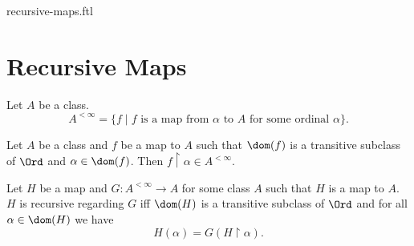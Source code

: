 \documentclass{naproche-library}
\begin{document}
\begin{smodule}{recursive-maps.ftl}

  \section*{Recursive Maps}

  \begin{definition}[forthel,id=SET_THEORY_04_1955917673267200,printid]
    Let $A$ be a class.
    \[ A^{< \infty} = \{f \mid \text{$f$ is a map from $\alpha$ to $A$ for some ordinal $\alpha$} \}. \]
  \end{definition}

  \begin{proposition}[forthel,id=SET_THEORY_04_7841726894964736,printid]
    Let $A$ be a class and $f$ be a map to $A$ such that $\dom(f)$ is a transitive subclass of $\Ord$ and $\alpha \in \dom(f)$.
    Then $f \restriction \alpha \in A^{< \infty}$.
  \end{proposition}

  \begin{forthel}
  \end{forthel}

  \begin{definition}[forthel,id=SET_THEORY_04_5597213870784512,printid]
    Let $H$ be a map and $G : A^{< \infty} \to A$ for some class $A$ such that $H$ is a map to $A$.
    $H$ is recursive regarding $G$ iff $\dom(H)$ is a transitive subclass of $\Ord$ and for all $\alpha \in \dom(H)$ we have \[ H(\alpha) = G(H \restriction \alpha). \]
  \end{definition}

  \begin{forthel}
  \end{forthel}
\end{smodule}
\end{document}
